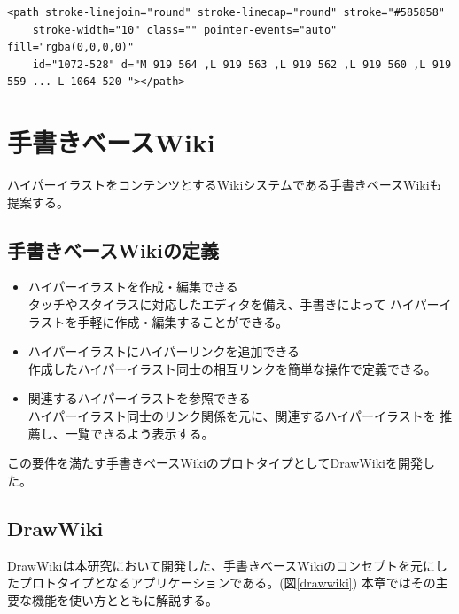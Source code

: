 \begin{lstlisting}[caption=図\ref{tegakipath}の実体, label=tegakipathcode]
    <path stroke-linejoin="round" stroke-linecap="round" stroke="#585858"
    stroke-width="10" class="" pointer-events="auto" fill="rgba(0,0,0,0)"
    id="1072-528" d="M 919 564 ,L 919 563 ,L 919 562 ,L 919 560 ,L 919 559 ... L 1064 520 "></path>
\end{lstlisting}


\section{手書きベースWiki}
ハイパーイラストをコンテンツとするWikiシステムである手書きベースWikiも提案する。


\subsection{手書きベースWikiの定義}
\begin{itemize}
    \item ハイパーイラストを作成・編集できる\\
    タッチやスタイラスに対応したエディタを備え、手書きによって
    ハイパーイラストを手軽に作成・編集することができる。
    \item ハイパーイラストにハイパーリンクを追加できる \\
    作成したハイパーイラスト同士の相互リンクを簡単な操作で定義できる。
    \item 関連するハイパーイラストを参照できる \\
    ハイパーイラスト同士のリンク関係を元に、関連するハイパーイラストを
    推薦し、一覧できるよう表示する。
\end{itemize}
この要件を満たす手書きベースWikiのプロトタイプとしてDrawWikiを開発した。

\subsection{DrawWiki}
DrawWikiは本研究において開発した、手書きベースWikiのコンセプトを元にしたプロトタイプとなるアプリケーションである。(図\ref{drawwiki})
本章ではその主要な機能を使い方とともに解説する。

